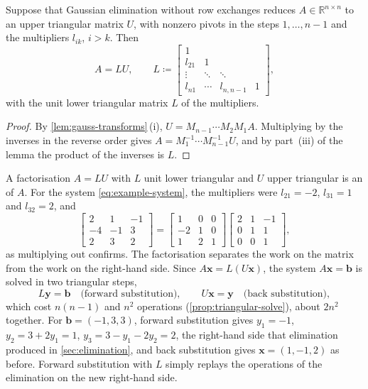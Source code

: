 \begin{theorem}[Elimination computes $A=LU$]
\label{thm:lu-elimination}
Suppose that Gaussian elimination without row exchanges reduces $A\in\mathbb R^{n\times n}$ to an upper triangular matrix $U$, with nonzero pivots in the steps $1,\ldots,n-1$ and the multipliers $l_{ik}$, $i>k$. Then
\[
A=LU,\qquad L\coloneqq\begin{bmatrix}1&&&\\l_{21}&1&&\\\vdots&\ddots&\ddots&\\l_{n1}&\cdots&l_{n,n-1}&1\end{bmatrix},
\]
with the unit lower triangular matrix $L$ of the multipliers.
\end{theorem}

\begin{proof}
By \cref{lem:gauss-transforms}\,(i), $U=M_{n-1}\cdots M_2M_1A$. Multiplying by the inverses in the reverse order gives $A=M_1^{-1}\cdots M_{n-1}^{-1}U$, and by part~(iii) of the lemma the product of the inverses is $L$.
\end{proof}

A factorisation $A=LU$ with $L$ unit lower triangular and $U$ upper triangular is an  of $A$. For the system \eqref{eq:example-system}, the multipliers were $l_{21}=-2$, $l_{31}=1$ and $l_{32}=2$, and
\[
\begin{bmatrix}2&1&-1\\-4&-1&3\\2&3&2\end{bmatrix}=\begin{bmatrix}1&0&0\\-2&1&0\\1&2&1\end{bmatrix}\begin{bmatrix}2&1&-1\\0&1&1\\0&0&1\end{bmatrix},
\]
as multiplying out confirms. The factorisation separates the work on the matrix from the work on the right-hand side. Since $A\mathbf x=L(U\mathbf x)$, the system $A\mathbf x=\mathbf b$ is solved in two triangular steps,
\begin{equation}
L\mathbf y=\mathbf b\quad\text{(forward substitution)},\qquad U\mathbf x=\mathbf y\quad\text{(back substitution)},
\label{eq:lu-solve}
\end{equation}
which cost $n(n-1)$ and $n^2$ operations (\cref{prop:triangular-solve}), about $2n^2$ together. For $\mathbf b=(-1,3,3)$, forward substitution gives $y_1=-1$, $y_2=3+2y_1=1$, $y_3=3-y_1-2y_2=2$, the right-hand side that elimination produced in \cref{sec:elimination}, and back substitution gives $\mathbf x=(1,-1,2)$ as before. Forward substitution with $L$ simply replays the operations of the elimination on the new right-hand side.

